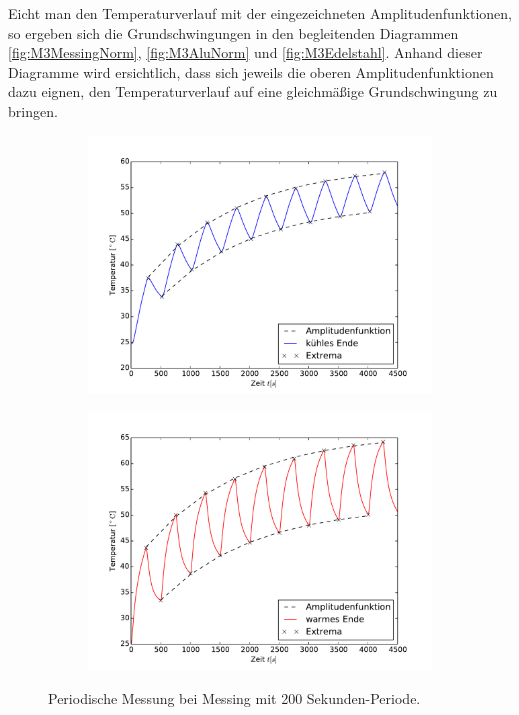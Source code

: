 Eicht man den Temperaturverlauf mit der eingezeichneten Amplitudenfunktionen, so ergeben sich die Grundschwingungen in den begleitenden Diagrammen \ref{fig:M3MessingNorm}, \ref{fig:M3AluNorm} und \ref{fig:M3Edelstahl}. 
Anhand dieser Diagramme wird ersichtlich, dass sich jeweils die oberen Amplitudenfunktionen dazu eignen, den Temperaturverlauf auf eine gleichmäßige Grundschwingung zu bringen.
\begin{figure}[h!]
	\centering
	\begin{subfigure}{0.9\textwidth}
	\includegraphics[width=\textwidth]{Bilder/M3_Messing_kuehl.pdf}
	\end{subfigure}
	\begin{subfigure}{0.9\textwidth}
	\includegraphics[width=\textwidth]{Bilder/M3_Messing_warm.pdf}
	\end{subfigure}
	\caption{Periodische Messung bei Messing mit 200 Sekunden-Periode.}
	\label{fig:M3Messing}
\end{figure}
